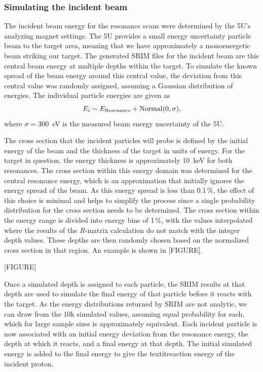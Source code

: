 \subsubsection{Simulating the incident
beam}\label{simulating-the-incident-beam}

The incident beam energy for the resonance scans were determined by the
5U's analyzing magnet settings. The 5U provides a small energy
uncertainty particle beam to the target area, meaning that we have
approximately a monoenergetic beam striking our target. The generated
SRIM files for the incident beam are this central beam energy at
multiple depths within the target. To simulate the known spread of the
beam energy around this central value, the deviation from this central
value was randomly assigned, assuming a Gaussian distribution of
energies. The individual particle energies are given as
\[
    E_i \sim E_{\rm{Resonance}} + \rm{Normal}(0, \sigma),
\]
where $\sigma = 300$~eV is the measured beam energy uncertainty of the
5U.

The cross section that the incident particles will probe is defined by
the initial energy of the beam and the thickness of the target in units
of energy. For the target in question, the energy thickness is
approximately 10~keV for both resonances. The cross section within this
energy domain was determined for the central resonance energy, which is
an approximation that initially ignores the energy spread of the beam.
As this energy spread is less than 0.1\,\%, the effect of this choice is
minimal and helps to simplify the process since a single probability
distribution for the cross section needs to be determined. The cross
section within the energy range is divided into energy bins of 1\,\%,
with the values interpolated where the results of the $R$-matrix
calculation do not match with the integer depth values. These depths are
then randomly chosen based on the normalized cross section in that
region. An example is shown in [FIGURE].

[FIGURE]

Once a simulated depth is assigned to each particle, the SRIM results at
that depth are used to simulate the final energy of that particle before
it reacts with the target. As the energy distributions returned by SRIM
are not analytic, we can draw from the 10k simulated values, assuming
equal probability for each, which for large sample sizes is
approximately equivalent. Each incident particle is now associated with
an initial energy deviation from the resonance energy, the depth at
which it reacts, and a final energy at that depth. The initial simulated
energy is added to the final energy to give the textit{reaction energy}
of the incident proton.



